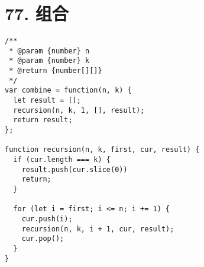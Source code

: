 \newpage
\section{77. 组合}
\label{leetcode:77}

\begin{verbatim}
/**
 * @param {number} n
 * @param {number} k
 * @return {number[][]}
 */
var combine = function(n, k) {
  let result = [];
  recursion(n, k, 1, [], result);
  return result;
};

function recursion(n, k, first, cur, result) {
  if (cur.length === k) {
    result.push(cur.slice(0))
    return;
  }

  for (let i = first; i <= n; i += 1) {
    cur.push(i);
    recursion(n, k, i + 1, cur, result);
    cur.pop();
  }
}
\end{verbatim}